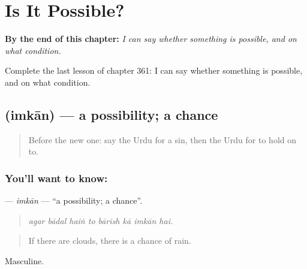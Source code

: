 
\chapter{Is It Possible?}
\label{ch:ur-is-it-possible}

\begin{chapteropening}
\textbf{By the end of this chapter:} \emph{I can say whether something is possible, and on what condition.}

Complete the last lesson of chapter 361: I can say whether something is possible, and on what condition.
\end{chapteropening}

\section[\texorpdfstring{\ur{امکان} (imkān)}{امکان (imkān)}]{ (imkān) — a possibility; a chance}

\label{lesson:UR-C361-imkan}



\begin{quote}
Before the new one: say the Urdu for a sin, then the Urdu for to hold on to.
\end{quote}

\subsection*{You'll want to know: }
\textbf{} — \emph{imkān} — \textquotedblleft{}a possibility; a chance\textquotedblright{}.

\begin{quote}
       
\end{quote}

\begin{quote}
\emph{agar bādal haiṅ to bārish kā imkān hai.}
\end{quote}

\begin{quote}
If there are clouds, there is a chance of rain.
\end{quote}

Masculine.


